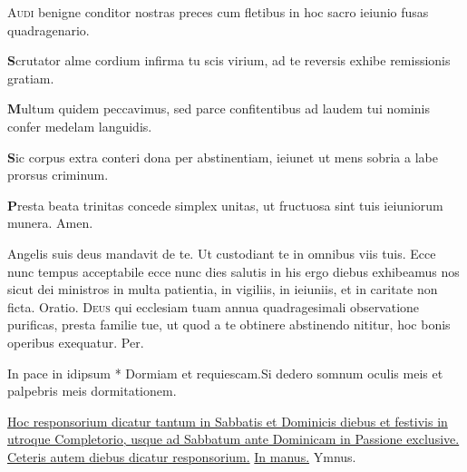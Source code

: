\begin{multicols*}{2}
{\lettrine[lines=2]{\zallmancaps \color{Blue} A}{udi} benigne conditor
nostras preces cum fletibus
in hoc sacro ieiunio
fusas quadragenario.
\par {\bfseries \color{Red} S}crutator alme cordium
infirma tu scis virium,
ad te reversis exhibe
remissionis gratiam.
\par {\bfseries \color{Blue} M}ultum quidem peccavimus,
sed parce confitentibus
ad laudem tui nominis
confer medelam languidis.
\par {\bfseries \color{Red} S}ic corpus extra conteri
dona per abstinentiam,
ieiunet ut mens sobria
a labe prorsus criminum.
\par {\bfseries \color{Blue} P}resta beata trinitas
concede simplex unitas,
ut fructuosa sint tuis
ieiuniorum munera. Amen.
}
\newline \V Angelis suis deus mandavit de te.
\newline \R Ut custodiant te in omnibus viis tuis.
 Ecce nunc tempus acceptabile ecce nunc dies salutis in his ergo diebus exhibeamus nos sicut dei ministros in multa patientia, in vigiliis, in ieiuniis, et in caritate non ficta. {\color{Red} Oratio.}
\lettrine[lines=2]{\zallmancaps \color{Red} D}{eus} qui ecclesiam tuam annua quadragesimali observatione purificas, presta familie tue, ut quod a te obtinere abstinendo nititur, hoc bonis operibus exequatur. Per.
\begin{responsory-breve}[in-pace]
{In pace in idipsum * Dormiam et requiescam.}{Si dedero somnum oculis meis et palpebris meis dormitationem.}
\end{responsory-breve}
\newline \ul{Hoc responsorium dicatur tantum in Sabbatis et Dominicis diebus et festivis in utroque Completorio, usque ad Sabbatum ante Dominicam in Passione exclusive. Ceteris autem diebus dicatur responsorium.} \hyperlink{in-manus-tuas-breve}{In manus.} {\color{Red} Ymnus.}
\end{multicols*}
